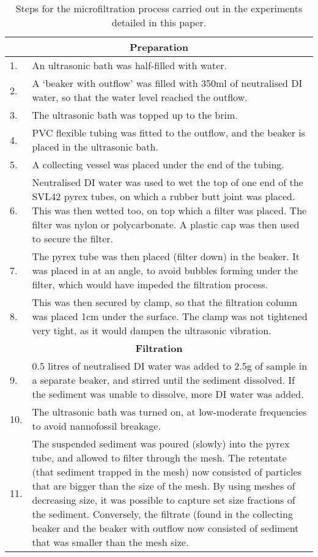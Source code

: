 \documentclass[12pt]{article}\usepackage[]{graphicx}\usepackage[]{color}
\begin{document}
\renewcommand\arraystretch{1.5}%
\begin{longtable}{|p{1cm}|p{14cm}|}
\caption{Steps for the microfiltration process carried out in the experiments detailed in this paper.} \label{tab:FilterPrep}\\
\multicolumn{2}{c}{\textbf{Preparation}}
\\ \hline
1. & An ultrasonic bath was half-filled with water.
\\ \hline
2. & A `beaker with outflow' was filled with 350ml of neutralised DI water, so that the water level reached the outflow.
\\ \hline
3. & The ultrasonic bath was topped up to the brim. 
\\ \hline
4. & PVC flexible tubing was fitted to the outflow, and the beaker is placed in the ultrasonic bath. 
\\ \hline
5. & A collecting vessel was placed under the end of the tubing. 
\\ \hline
6. & Neutralised DI water was used to wet the top of one end of the SVL42 pyrex tubes, on which a rubber butt joint was placed. This was then wetted too, on top which a filter was placed. The filter was nylon or polycarbonate. A plastic cap was then used to secure the filter.
\\ \hline
7. & The pyrex tube was then placed (filter down) in the beaker. It was placed in at an angle, to avoid bubbles forming under the filter, which would have impeded the filtration process. 
\\ \hline
8. & This was then secured by clamp, so that the filtration column was placed 1cm under the surface. The clamp was not tightened very tight, as it would dampen the ultrasonic vibration. 
\\ \hline
\multicolumn{2}{c}{\textbf{Filtration}}
\\ \hline
9. & 0.5 litres of neutralised DI water was added to 2.5g of sample in a separate beaker, and stirred until the sediment dissolved. If the sediment was unable to dissolve, more DI water was added. 
\\ \hline
10. & The ultrasonic bath was turned on, at low-moderate frequencies to avoid nannofossil breakage. 
\\ \hline
11. & The suspended sediment was poured (slowly) into the pyrex tube, and allowed to filter through the mesh. The retentate (that sediment trapped in the mesh) now consisted of particles that are bigger than the size of the mesh. By using meshes of decreasing size, it was possible to capture set size fractions of the sediment. Conversely, the filtrate (found in the collecting beaker and the beaker with outflow now consisted of sediment that was smaller than the mesh size. 

\end{longtable}
\end{document}

